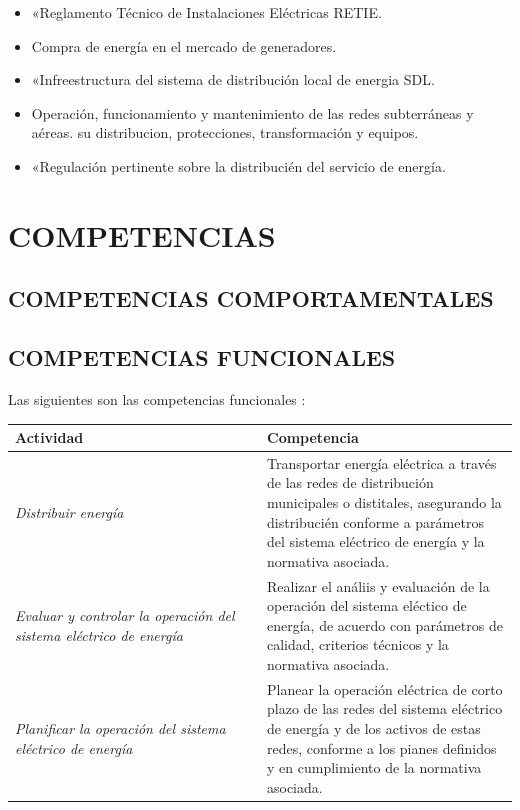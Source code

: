 \documentclass[a5paper]{book}%
\begin{document}
\begin{itemize}
	\item «Reglamento Técnico de Instalaciones Eléctricas RETIE.
	\item Compra de energía en el mercado de generadores.
	\item «Infreestructura del sistema de distribución local de energia SDL.
	\item Operación, funcionamiento y mantenimiento de las redes subterráneas y aéreas.
	su distribucion, protecciones, transformación y equipos.
	\item «Regulación pertinente sobre la distribucién del servicio de energía.
\end{itemize}

\section{COMPETENCIAS}

\subsection{COMPETENCIAS COMPORTAMENTALES}

\subsection{COMPETENCIAS FUNCIONALES}

Las siguientes son las competencias funcionales :\\

\begin{table}[H]
	\begin{tabular}{|p{0.5\linewidth}|p{0.5\linewidth}|}
		\hline
		\textbf{Actividad} &  \textbf{Competencia} \\\hline
		\textit{Distribuir energía} & Transportar energía eléctrica a través de las redes de distribución municipales o distitales, asegurando la distribucién conforme a parámetros del sistema eléctrico de energía    y la normativa asociada.\\\hline
		\textit{Evaluar y controlar la operación del sistema eléctrico de energía} &  Realizar el análiis y evaluación de la operación del sistema eléctico de energía, de acuerdo con parámetros de calidad, criterios técnicos y la normativa asociada. \\\hline
		\textit{Planificar la operación del sistema eléctrico de energía} & Planear la operación eléctrica de corto plazo de las redes del sistema eléctrico de energía y de los activos de  estas redes, conforme a los pianes definidos y en cumplimiento de la normativa asociada.\\\hline
	\end{tabular}
\end{table}
\end{document}
